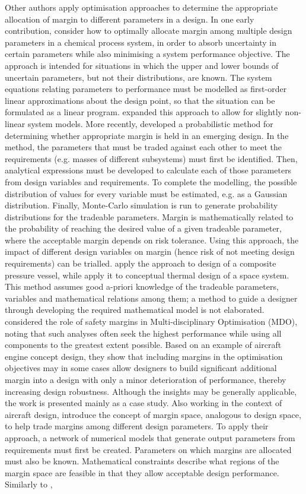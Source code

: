Other authors apply optimisation approaches to determine the appropriate allocation of margin to different parameters in a design. In one early contribution, \cite{Takamatsu1974} consider how to optimally allocate margin among multiple design parameters in a chemical process system, in order to absorb uncertainty in certain parameters while also minimising a system performance objective. The approach is intended for situations in which the upper and lower bounds of uncertain parameters, but not their distributions, are known. The system equations relating parameters to performance must be modelled as first-order linear approximations about the design point, so that the situation can be formulated as a linear program. \cite{Dittmar1976} expanded this approach to allow for slightly non-linear system models. More recently, \cite{Thunnisen2004} developed a probabilistic method for determining whether appropriate margin is held in an emerging design. In the method, the parameters that must be traded against each other to meet the requirements (e.g. masses of different subsystems) must first be identified. Then, analytical expressions must be developed to calculate each of those parameters from design variables and requirements. To complete the modelling, the possible distribution of values for every variable must be estimated, e.g. as a Gaussian distribution. Finally, Monte-Carlo simulation is run to generate probability distributions for the tradeable parameters. Margin is mathematically related to the probability of reaching the desired value of a given tradeable parameter, where the acceptable margin depends on risk tolerance. Using this approach, the impact of different design variables on margin (hence risk of not meeting design requirements) can be trialled. \cite{Thunnisen2004} apply the approach to design of a composite pressure vessel, while \cite{Thunnissen2004b} apply it to conceptual thermal design of a space system. This method assumes good a-priori knowledge of the tradeable parameters, variables and mathematical relations among them; a method to guide a designer through developing the required mathematical model is not elaborated. \cite{Tan2016} considered the role of safety margins in Multi-disciplinary Optimisation (MDO), noting that such analyses often seek the highest performance while using all components to the greatest extent possible. Based on an example of aircraft engine concept design, they show that including margins in the optimisation objectives may in some cases allow designers to build significant additional margin into a design with only a minor deterioration of performance, thereby increasing design robustness. Although the insights may be generally applicable, the work is presented mainly as a case study. Also working in the context of aircraft design, \cite{Guenov2018} introduce the concept of margin space, analogous to design space, to help trade margins among different design parameters. To apply their approach, a network of numerical models that generate output parameters from requirements must first be created. Parameters on which margins are allocated must also be known. Mathematical constraints describe what regions of the margin space are feasible in that they allow acceptable design performance. Similarly to \cite{Thunnisen2004}, 
